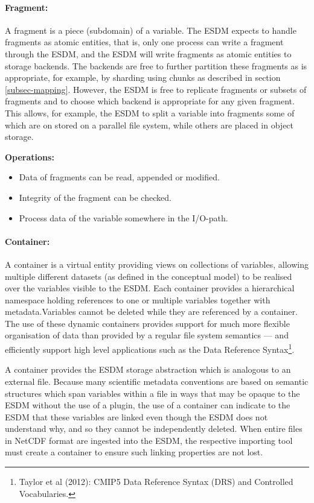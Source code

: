 \paragraph{Fragment:}  A fragment is a piece (subdomain) of a variable. The ESDM expects to handle fragments as atomic entities, that is, only one process can write  a fragment through the ESDM, and the ESDM will write fragments as atomic entities to storage backends.
The backends are free to further partition these fragments as is appropriate, for example, by sharding using chunks as described in section \ref{subsec-mapping}.
However, the ESDM is free to replicate fragments or subsets of fragments and to choose which backend is appropriate for any given fragment.
This allows, for example, the ESDM to split a variable into fragments some of which are on stored on a parallel file system, while others are placed in object storage.

\textbf{Operations:}
\begin{itemize}
	\item Data of fragments can be read, appended or modified.
	\item Integrity of the fragment can be checked.
	\item Process data of the variable somewhere in the I/O-path.
\end{itemize}

\paragraph{Container:} A container is a virtual entity providing views on collections of variables, allowing multiple different datasets (as defined in the conceptual model) to be realised over the variables visible to the ESDM.  Each container provides a hierarchical namespace holding references to one or multiple variables together with metadata.Variables cannot be deleted while they are referenced by a container.  The use of these dynamic containers provides support for much more flexible organisation of data than provided by a regular file system semantics --- and efficiently support high level applications such as the Data Reference Syntax\footnote{Taylor et al (2012): CMIP5 Data Reference Syntax (DRS) and
Controlled Vocabularies.}.

A container provides the ESDM storage abstraction which is analogous to an external file. Because many scientific metadata conventions are based on semantic structures which span variables within a file in ways that may be opaque to the ESDM without the use of a plugin, the use of a container can indicate to the ESDM that these variables are linked even though the ESDM does not understand why, and so they cannot be independently deleted.
When entire files in NetCDF format are ingested into the ESDM, the respective importing tool must create  a container to ensure such linking properties are not lost.

